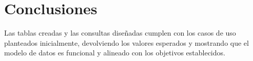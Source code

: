 \documentclass[]{article}
\begin{document}
\newpage
\section{Conclusiones}

Las tablas creadas y las consultas diseñadas cumplen con los casos de uso planteados inicialmente, devolviendo los valores esperados y mostrando que el modelo de datos es funcional y alineado con los objetivos establecidos.

\label{sec:conclusion}
\end{document}
